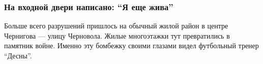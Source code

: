  
 
 
 
 

\subsubsection{На входной двери написано: \enquote{Я еще жива}}

Больше всего разрушений пришлось на обычный жилой район в центре Чернигова —
улицу Черновола. Жилые многоэтажки тут превратились в памятник войне. Именно
эту бомбежку своими глазами видел футбольный тренер \enquote{Десны}.

